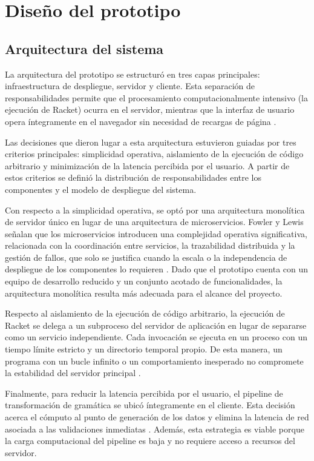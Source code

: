 \section{Diseño del prototipo}

\subsection{Arquitectura del sistema}

La arquitectura del prototipo se estructuró en tres capas principales: infraestructura de despliegue, servidor y cliente. Esta separación de responsabilidades permite que el procesamiento computacionalmente intensivo (la ejecución de Racket) ocurra en el servidor, mientras que la interfaz de usuario opera íntegramente en el navegador sin necesidad de recargas de página \cite{Fielding2000REST}.

Las decisiones que dieron lugar a esta arquitectura estuvieron guiadas por tres criterios principales: simplicidad operativa, aislamiento de la ejecución de código arbitrario y minimización de la latencia percibida por el usuario. A partir de estos criterios se definió la distribución de responsabilidades entre los componentes y el modelo de despliegue del sistema.

Con respecto a la simplicidad operativa, se optó por una arquitectura monolítica de servidor único en lugar de una arquitectura de microservicios. Fowler y Lewis señalan que los microservicios introducen una complejidad operativa significativa, relacionada con la coordinación entre servicios, la trazabilidad distribuida y la gestión de fallos, que solo se justifica cuando la escala o la independencia de despliegue de los componentes lo requieren \cite{fowler2014microservices}. Dado que el prototipo cuenta con un equipo de desarrollo reducido y un conjunto acotado de funcionalidades, la arquitectura monolítica resulta más adecuada para el alcance del proyecto.

Respecto al aislamiento de la ejecución de código arbitrario, la ejecución de Racket se delega a un subproceso del servidor de aplicación en lugar de separarse como un servicio independiente. Cada invocación se ejecuta en un proceso con un tiempo límite estricto y un directorio temporal propio. De esta manera, un programa con un bucle infinito o un comportamiento inesperado no compromete la estabilidad del servidor principal \cite{tanenbaum2015modern}.

Finalmente, para reducir la latencia percibida por el usuario, el pipeline de transformación de gramática se ubicó íntegramente en el cliente. Esta decisión acerca el cómputo al punto de generación de los datos y elimina la latencia de red asociada a las validaciones inmediatas \cite{Fielding2000REST}. Además, esta estrategia es viable porque la carga computacional del pipeline es baja y no requiere acceso a recursos del servidor.

